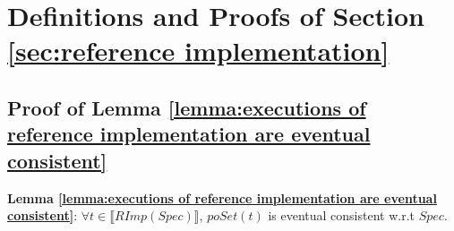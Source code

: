 
\section{Definitions and Proofs of Section \ref{sec:reference implementation}}
\label{sec:definitions and proofs of section reference implementation}



\subsection{Proof of Lemma \ref{lemma:executions of reference implementation are eventual consistent}}
\label{subsec:proof of lemma executions of reference implementation are eventual consistent}

{\noindent \bf Lemma \ref{lemma:executions of reference implementation are eventual consistent}}: $\forall t \in \llbracket RImp(Spec) \rrbracket$, $poSet(t)$ is eventual consistent w.r.t $Spec$. 

